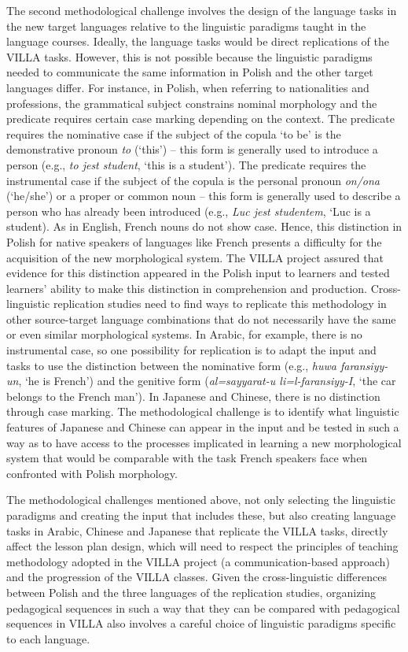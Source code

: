 \documentclass[output=paper,colorlinks,citecolor=brown,modfonts,nonflat]{../langscibook}
\begin{document}
The second methodological challenge involves the design of the language tasks in the new target languages relative to the linguistic paradigms taught in the language courses. Ideally, the language tasks would be direct replications of the VILLA tasks. However, this is not possible because the linguistic paradigms needed to communicate the same information in Polish and the other target languages differ. For instance, in Polish, when referring to nationalities and professions, the grammatical subject constrains nominal morphology and the predicate requires certain case marking depending on the context. The predicate requires the nominative case if the subject of the copula ‘to be’ is the demonstrative pronoun \textit{to} (‘this’) – this form is generally used to introduce a person (e.g., \textit{to jest student}, ‘this is a student’). The predicate requires the instrumental case if the subject of the copula is the personal pronoun \textit{on/ona} (‘he/she’) or a proper or common noun – this form is generally used to describe a person who has already been introduced (e.g., \textit{Luc jest studentem}, ‘Luc is a student). As in English, French nouns do not show case. Hence, this distinction in Polish for native speakers of languages like French presents a difficulty for the acquisition of the new morphological system. The VILLA project assured that evidence for this distinction appeared in the Polish input to learners and tested learners’ ability to make this distinction in comprehension and production. Cross-linguistic replication studies need to find ways to replicate this methodology in other source-target language combinations that do not necessarily have the same or even similar morphological systems. In Arabic, for example, there is no instrumental case, so one possibility for replication is to adapt the input and tasks to use the distinction between the nominative form (e.g., \textit{huwa faransiyy-un}, ‘he is French’) and the genitive form (\textit{al=sayyarat-u li=l-faransiyy-I}, ‘the car belongs to the French man’). In Japanese and Chinese, there is no distinction through case marking. The methodological challenge is to identify what linguistic features of Japanese and Chinese can appear in the input and be tested in such a way as to have access to the processes implicated in learning a new morphological system that would be comparable with the task French speakers face when confronted with Polish morphology.

The methodological challenges mentioned above, not only selecting the linguistic paradigms and creating the input that includes these, but also creating language tasks in Arabic, Chinese and Japanese that replicate the VILLA tasks, directly affect the lesson plan design, which will need to respect the principles of teaching methodology adopted in the VILLA project (a communication-based approach) and the progression of the VILLA classes. Given the cross-linguistic differences between Polish and the three languages of the replication studies, organizing pedagogical sequences in such a way that they can be compared with pedagogical sequences in VILLA also involves a careful choice of linguistic paradigms specific to each language.
\end{document}

